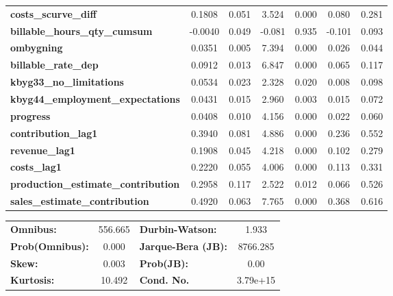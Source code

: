 \begin{center}
\begin{tabular}{lcccccc}
\textbf{costs\_scurve\_diff}                &       0.1808  &        0.051     &     3.524  &         0.000        &        0.080    &        0.281     \\
\textbf{billable\_hours\_qty\_cumsum}       &      -0.0040  &        0.049     &    -0.081  &         0.935        &       -0.101    &        0.093     \\
\textbf{ombygning}                          &       0.0351  &        0.005     &     7.394  &         0.000        &        0.026    &        0.044     \\
\textbf{billable\_rate\_dep}                &       0.0912  &        0.013     &     6.847  &         0.000        &        0.065    &        0.117     \\
\textbf{kbyg33\_no\_limitations}            &       0.0534  &        0.023     &     2.328  &         0.020        &        0.008    &        0.098     \\
\textbf{kbyg44\_employment\_expectations}   &       0.0431  &        0.015     &     2.960  &         0.003        &        0.015    &        0.072     \\
\textbf{progress}                           &       0.0408  &        0.010     &     4.156  &         0.000        &        0.022    &        0.060     \\
\textbf{contribution\_lag1}                 &       0.3940  &        0.081     &     4.886  &         0.000        &        0.236    &        0.552     \\
\textbf{revenue\_lag1}                      &       0.1908  &        0.045     &     4.218  &         0.000        &        0.102    &        0.279     \\
\textbf{costs\_lag1}                        &       0.2220  &        0.055     &     4.006  &         0.000        &        0.113    &        0.331     \\
\textbf{production\_estimate\_contribution} &       0.2958  &        0.117     &     2.522  &         0.012        &        0.066    &        0.526     \\
\textbf{sales\_estimate\_contribution}      &       0.4920  &        0.063     &     7.765  &         0.000        &        0.368    &        0.616     \\
\bottomrule
\end{tabular}
\begin{tabular}{lclc}
\textbf{Omnibus:}       & 556.665 & \textbf{  Durbin-Watson:     } &    1.933  \\
\textbf{Prob(Omnibus):} &   0.000 & \textbf{  Jarque-Bera (JB):  } & 8766.285  \\
\textbf{Skew:}          &   0.003 & \textbf{  Prob(JB):          } &     0.00  \\
\textbf{Kurtosis:}      &  10.492 & \textbf{  Cond. No.          } & 3.79e+15  \\
\bottomrule
\end{tabular}
\end{center}

